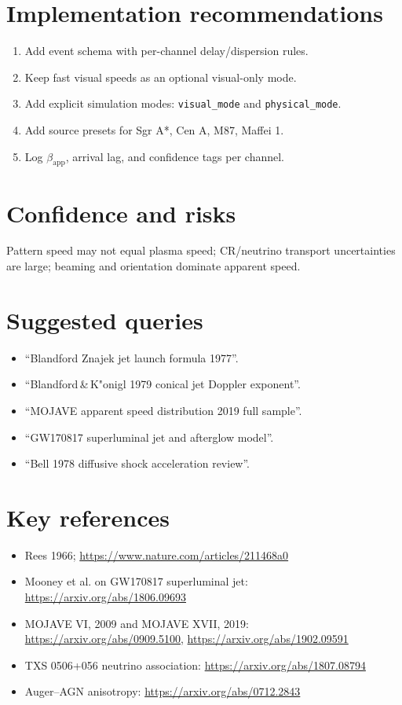\documentclass[11pt]{article}
\begin{document}
\section{Implementation recommendations}
\begin{enumerate}
\item Add event schema with per-channel delay/dispersion rules.
\item Keep fast visual speeds as an optional visual-only mode.
\item Add explicit simulation modes: \texttt{visual\_mode} and \texttt{physical\_mode}.
\item Add source presets for Sgr A*, Cen A, M87, Maffei 1.
\item Log $\beta_{\mathrm{app}}$, arrival lag, and confidence tags per channel.
\end{enumerate}

\section{Confidence and risks}
Pattern speed may not equal plasma speed; CR/neutrino transport uncertainties are large; beaming and orientation dominate apparent speed.

\section{Suggested queries}
\begin{itemize}
\item ``Blandford Znajek jet launch formula 1977''.
\item ``Blandford\,\&\,K"onigl 1979 conical jet Doppler exponent''.
\item ``MOJAVE apparent speed distribution 2019 full sample''.
\item ``GW170817 superluminal jet and afterglow model''.
\item ``Bell 1978 diffusive shock acceleration review''.
\end{itemize}

\section{Key references}
\begin{itemize}
\item Rees 1966; \url{https://www.nature.com/articles/211468a0}
\item Mooney et al. on GW170817 superluminal jet: \url{https://arxiv.org/abs/1806.09693}
\item MOJAVE VI, 2009 and MOJAVE XVII, 2019: \url{https://arxiv.org/abs/0909.5100}, \url{https://arxiv.org/abs/1902.09591}
\item TXS 0506+056 neutrino association: \url{https://arxiv.org/abs/1807.08794}
\item Auger--AGN anisotropy: \url{https://arxiv.org/abs/0712.2843}
\end{itemize}
\end{document}
